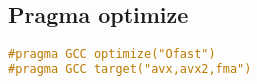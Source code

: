 \subsection{Pragma optimize}

\begin{lstlisting}[language=C++]
#pragma GCC optimize("Ofast")
#pragma GCC target("avx,avx2,fma")
\end{lstlisting}